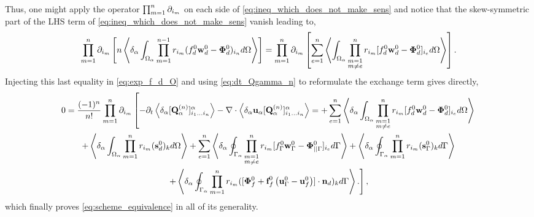 Thus, one might apply the operator $\prod_{m=1}^{n} \partial_{i_m}$ on each side of \ref{eq:ineq_which_does_not_make_sens} and notice that the skew-symmetric part of the LHS term of \ref{eq:ineq_which_does_not_make_sens} vanish leading to, 
\begin{equation*}
    \prod_{m=1}^{n} \partial_{i_m}\left[
        n\left<\delta_\alpha \int_{\Omega_\alpha} \prod_{m=1}^{n-1} r_{i_m} ( f_d^0 \textbf{w}_d^0-\bm\Phi_d^0)_{i_n} d\Omega\right>
        \right]
    =
    \prod_{m=1}^{n} \partial_{i_m}\left[
    \sum_{e=1}^{n} 
    \left<
        \int_{\Omega_{\alpha}} 
        \prod^{n}_{\substack{ m=1 \\m \neq e}} r_{i_m} [f_d^0 \textbf{w}_d^0  - \bm\Phi_d^0]_{i_e}
         d\Omega
    \right>
    \right]. 
    \label{eq:it_make_sens_again}
\end{equation*}
Injecting this last equality in \ref{eq:exp_f_d_O} and using \ref{eq:dt_Qgamma_n} to reformulate the exchange term gives directly, 
\begin{multline}
    0 = \frac{(-1)^n}{n!}
    \prod_{m=1}^{n} \partial_{i_m}
    \left[
        - \partial_t \left<\delta_\alpha [\textbf{Q}_\alpha^{(n)}]_{i_1\ldots i_n}^\alpha\right>
        - \mathbf{\nabla}\cdot  \left<\delta_\alpha \textbf{u}_\alpha [\textbf{Q}_\alpha^{(n)}]_{i_1\ldots i_n}^\alpha\right>
        =+\sum_{e=1}^{n} 
        \left<\delta_\alpha \int_{\Omega_{\alpha}} 
            \prod^{n}_{\substack{ m=1 \\m \neq e}} r_{i_m} [f_d^0\textbf{w}_d^0  - \bm\Phi_d^0]_{i_e}
         d\Omega\right>\right.\\\left.
        + \left<\delta_\alpha \int_{\Omega_{\alpha}}  \prod_{m=1}^{n} r_{i_m} (\textbf{s}_d^0)_k  d\Omega\right>
        +     
        \sum_{e=1}^{n} 
        \left<\delta_\alpha \oint_{\Gamma_{\alpha}} 
            \prod^{n}_{\substack{ m=1 \\m \neq e}} r_{i_m} [f_\Gamma^0\textbf{w}_\Gamma^0 - \bm\Phi_{||\Gamma}^0]_{i_e}
         d\Gamma\right>
        + \left<\delta_\alpha \oint_{\Gamma_{\alpha}}  \prod_{m=1}^{n} r_{i_m} (\textbf{s}_\Gamma^0)_k  d\Gamma\right> \right.\\\left.
        +\left<\delta_\alpha \oint_{\Gamma_{\alpha}}  \prod_{m=1}^{n} r_{i_m} ([\bm\Phi_f^0 + \textbf{f}_f^0 \left(\textbf{u}_\Gamma^0 - \textbf{u}_f^0\right)]\cdot \textbf{n}_d)_k  d\Gamma\right>. 
    \right],
\end{multline}
which finally proves \ref{eq:scheme_equivalence} in all of its generality.